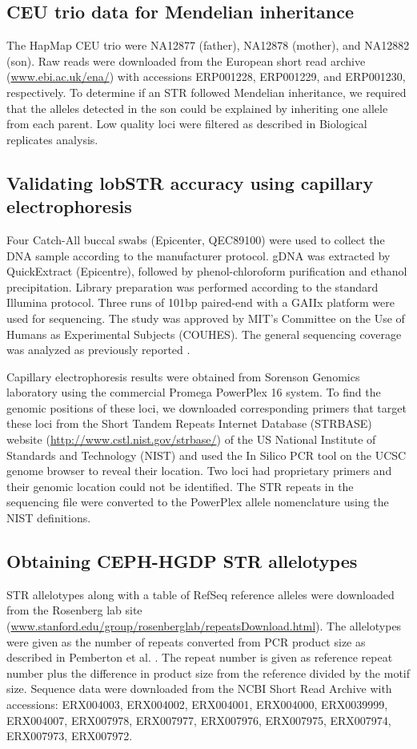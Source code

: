 \subsection{CEU trio data for Mendelian inheritance}
The HapMap CEU trio were NA12877 (father), NA12878 (mother), and NA12882 (son). Raw reads were downloaded from the European short read archive (\url{www.ebi.ac.uk/ena/}) with accessions ERP001228, ERP001229, and ERP001230, respectively. To determine if an STR followed Mendelian inheritance, we required that the alleles detected in the son could be explained by inheriting one allele from each parent. Low quality loci were filtered as described in Biological replicates analysis.

\subsection{Validating lobSTR accuracy using capillary electrophoresis}
Four Catch-All buccal swabs (Epicenter, QEC89100) were used to collect the DNA sample according to the manufacturer protocol. gDNA was extracted by QuickExtract (Epicentre), followed by phenol-chloroform purification and ethanol precipitation. Library preparation was performed according to the standard Illumina protocol. Three runs of 101bp paired-end with a GAIIx platform were used for sequencing. The study was approved by MIT’s Committee on the Use of Humans as Experimental Subjects (COUHES). The general sequencing coverage was analyzed as previously reported \cite{ErlichEdvardsonHodgesEtAl2011}. 

Capillary electrophoresis results were obtained from Sorenson Genomics laboratory using the commercial Promega PowerPlex 16 system. To find the genomic positions of these loci, we downloaded corresponding primers that target these loci from the Short Tandem Repeats Internet Database (STRBASE) website (\url{http://www.cstl.nist.gov/strbase/}) of the US National Institute of Standards and Technology (NIST) and used the In Silico PCR tool on the UCSC genome browser to reveal their location. Two loci had proprietary primers and their genomic location could not be identified. The STR repeats in the sequencing file were converted to the PowerPlex allele nomenclature using the NIST definitions.

\subsection{Obtaining CEPH-HGDP STR allelotypes}
STR allelotypes along with a table of RefSeq reference alleles were downloaded from the Rosenberg lab site (\url{www.stanford.edu/group/rosenberglab/repeatsDownload.html}). The allelotypes were given as the number of repeats converted from PCR product size as described in Pemberton et al. \cite{PembertonSandefurJakobssonEtAl2009}. The repeat number is given as reference repeat number plus the difference in product size from the reference divided by the motif size. Sequence data were downloaded from the NCBI Short Read Archive with accessions: ERX004003, ERX004002, ERX004001, ERX004000, ERX0039999, ERX004007, ERX007978, ERX007977, ERX007976, ERX007975, ERX007974, ERX007973, ERX007972.

